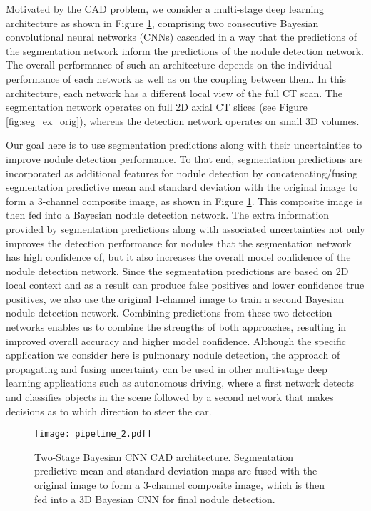 \documentclass{article}
\begin{document}
Motivated by the CAD problem, we consider a multi-stage deep learning architecture as shown in Figure \ref{fig:arch}, comprising two consecutive Bayesian convolutional neural networks (CNNs) cascaded in a way that the predictions of the segmentation network inform the predictions of the nodule detection network. The overall performance of such an architecture depends on the individual performance of each network as well as on the coupling between them. In this architecture, each network has a different local view of the full CT scan. The segmentation network operates on full 2D axial CT slices (see Figure \ref{fig:seg_ex_orig}), whereas the detection network operates on small 3D volumes. 

Our goal here is to use segmentation predictions along with their uncertainties to improve nodule detection performance. To that end, segmentation predictions are incorporated as additional features for nodule detection by concatenating/fusing segmentation predictive mean and standard deviation with the original image to form a 3-channel composite image, as shown in Figure \ref{fig:arch}. This composite image is then fed into a Bayesian nodule detection network. The extra information provided by segmentation predictions along with associated uncertainties not only improves the detection performance for nodules that the segmentation network has high confidence of, but it also increases the overall model confidence of the nodule detection network. Since the segmentation predictions are based on 2D local context and as a result can produce false positives and lower confidence true positives, we also use the original 1-channel image to train a second Bayesian nodule detection network. Combining predictions from these two detection networks enables us to combine the strengths of both approaches, resulting in improved overall accuracy and higher model confidence. Although the specific application we consider here is pulmonary nodule detection, the approach of propagating and fusing uncertainty can be used in other multi-stage deep learning applications such as autonomous driving,  where a first network detects and classifies objects in the scene followed by a second network that makes decisions as to which direction to steer the car.     

 

\begin{figure}[t!]
	\centering
	\texttt{[image: pipeline\_2.pdf]}
	\caption{Two-Stage Bayesian CNN CAD architecture. Segmentation predictive mean and standard deviation maps are fused with the original image to form a 3-channel composite image, which is then fed into a 3D Bayesian CNN for final nodule detection. } \vspace{-.25cm}\label{fig:arch}
	
\end{figure}
\end{document}
